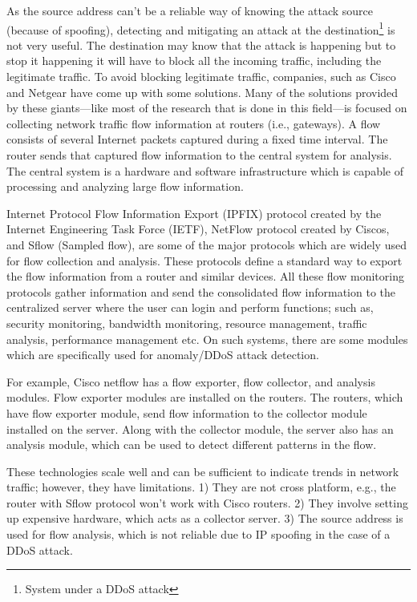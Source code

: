 \documentclass[12pt,oneside,a4paper]{article}
\begin{document}
As the source address can't be a reliable way of knowing the attack source (because of spoofing), detecting and mitigating an attack at the destination\footnote{System under a DDoS attack} is not very useful. The destination may know that the attack is happening but to stop it happening it will have to block all the incoming traffic, including the legitimate traffic. To avoid blocking legitimate traffic, companies, such as Cisco and Netgear have come up with some solutions. Many of the solutions provided by these giants---like most of the research that is done in this field---is focused on collecting network traffic flow information\cite{network-traffic-flow} at routers (i.e., gateways). A flow consists of several Internet packets captured during a fixed time interval. The router sends that captured flow information to the central system for analysis. The central system is a hardware and software infrastructure which is capable of processing and analyzing large flow information.\par

Internet Protocol Flow Information Export (IPFIX) protocol created by the Internet Engineering Task Force (IETF), NetFlow protocol created by Ciscos\cite{cisco-netflow}, and Sflow (Sampled flow)\cite{sflow}, are some of the major protocols which are widely used for flow collection and analysis. These protocols define a standard way to export the flow information from a router and similar devices. All these flow monitoring protocols gather information and send the consolidated flow information to the centralized server where the user can login and perform functions; such as, security monitoring, bandwidth monitoring, resource management, traffic analysis, performance management etc. On such systems, there are some modules which are specifically used for anomaly/DDoS attack detection.\par

For example, Cisco netflow has a flow exporter, flow collector, and analysis modules. Flow exporter modules are installed on the routers. The routers, which have flow exporter module, send flow information to the collector module installed on the server. Along with the collector module, the server also has an analysis module, which can be used to detect different patterns in the flow.\par

These technologies scale well and can be sufficient to indicate trends in network traffic; however, they have limitations. 1) They are not cross platform, e.g., the router with Sflow protocol won't work with Cisco routers. 2) They involve setting up expensive hardware, which acts as a collector server. 3) The source address is used for flow analysis, which is not reliable due to IP spoofing in the case of a DDoS attack.\par
\end{document}
